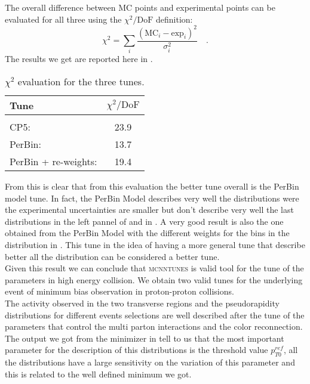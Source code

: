 The overall difference between MC points and experimental points can be evaluated for all three using the $\chi^2/\mathrm{DoF}$ definition:
\begin{equation}
	\chi^2=\displaystyle\sum_i\frac{(\text{MC}_i-\text{exp}_i)^2}{\sigma_i^2}\quad.
\end{equation}
The results we get are reported here in . 
\begin{table}[!htb]
	\centering
	\begin{tabular}{l  c }
		Tune & $\chi^2/\mathrm{DoF}$\\[2pt]\hline\hline
		\\[-0.85em]
		CP5: & 23.9\\[2pt]
		PerBin: & 13.7\\[2pt]
		PerBin + re-weights: & 19.4\\[2pt]
	\end{tabular}
	\caption{$\chi^2$ evaluation for the three tunes.}
	\label{table:chi2_MinBias}
\end{table}
From this is clear that from this evaluation the better tune overall is the PerBin model tune. In fact, the PerBin Model describes very well the distributions were the experimental uncertainties are smaller but don't describe very well the last distributions in the left pannel of  and in . A very good result is also the one obtained from the PerBin Model with the different weights for the bins in the distribution in . This tune in the idea of having a more general tune that describe better all the distribution can be considered a better tune.
\\
Given this result we can conclude that \textsc{mcnntunes} is valid tool for the tune of the parameters in high energy collision. We obtain two valid tunes for the underlying event of minimum bias observation in proton-proton collisions.
\\
The activity observed in the two transverse regions and the pseudorapidity distributions for different events selections are well described after the tune of the parameters that control the multi parton interactions and the color reconnection. 
\\
The output we got from the minimizer in  tell to us that the most important parameter for the description of this distributions is the threshold value $p_{T0}^{ref}$, all the distributions have a large sensitivity on the variation of this parameter and this is related to the well defined minimum we got.
